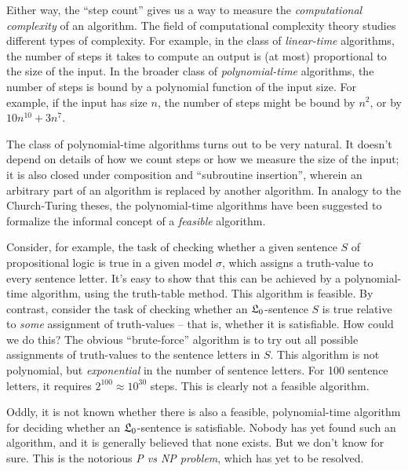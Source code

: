 Either way,
the ``step count'' gives us a way to measure the \emph{computational complexity} of an algorithm.
The field of computational complexity theory studies different types of complexity.
For example,
in the class of \emph{linear-time} algorithms,
the number of steps it takes to compute an output
is (at most) proportional to the size of the input.
In the broader class of \emph{polynomial-time} algorithms,
the number of steps is bound by a polynomial function of the input size.
For example,
if the input has size $n$,
the number of steps might be bound by $n^{2}$,
or by $10 n^{10} + 3 n^{7}$.

The class of polynomial-time algorithms turns out to be very natural.
It doesn't depend on details of how we count steps or
how we measure the size of the input;
it is also closed under composition and ``subroutine insertion'',
wherein an arbitrary part of an algorithm is replaced by another algorithm.
In analogy to the Church-Turing theses,
the polynomial-time algorithms have been suggested to
formalize the informal concept of a \emph{feasible} algorithm.

Consider, for example, the task of checking
whether a given sentence $S$ of propositional logic is true in a given model $\sigma$,
which assigns a truth-value to every sentence letter.
It's easy to show that this can be achieved by a polynomial-time algorithm,
using the truth-table method.
This algorithm is feasible.
By contrast,
consider the task of checking whether an $\mathfrak{L}_{0}$-sentence $S$
is true relative to \emph{some} assignment of truth-values --
that is, whether it is satisfiable.
How could we do this?
The obvious ``brute-force'' algorithm is to
try out all possible assignments of truth-values to the sentence letters in $S$.
This algorithm is not polynomial, but \emph{exponential} in the number of sentence letters.
For 100 sentence letters,
it requires $2^{100} \approx 10^{30}$ steps.
This is clearly not a feasible algorithm.

Oddly,
it is not known whether
there is also a feasible, polynomial-time algorithm for
deciding whether an $\mathfrak{L}_0$-sentence is satisfiable.
Nobody has yet found such an algorithm,
and it is generally believed that none exists.
But we don't know for sure.
This is the notorious \emph{P vs NP problem},
which has yet to be resolved.



